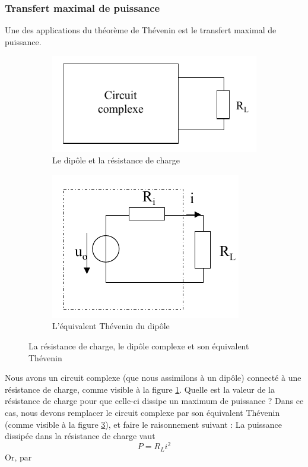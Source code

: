 \documentclass[12pt,a4paper]{article}
\begin{document}
\subsubsection{Transfert maximal de puissance}
Une des applications du théorème de Thévenin est le transfert maximal de puissance. 
\begin{figure}[!h]
	\centering
	\begin{subfigure}[b]{0.45\textwidth}
		\centering
		\includegraphics[scale=0.5]{images/transfert_max_puissance}
		\caption{Le dipôle et la résistance de charge}
		\label{subfig: transfert max puissance}
	\end{subfigure}
	\begin{subfigure}[b]{0.45\textwidth}
		\centering
		\includegraphics[scale=0.5]{images/thevenin_tmp}
		\caption{L'équivalent Thévenin du dipôle}
		\label{subfig: equi thevenin TMP}
	\end{subfigure}
	\caption{La résistance de charge, le dipôle complexe et son équivalent Thévenin}
\end{figure}
Nous avons un circuit complexe (que nous assimilons à un dipôle) connecté à une résistance de charge, comme visible à la figure \ref{subfig: transfert max puissance}. Quelle est la valeur de la résistance de charge pour que celle-ci dissipe un maximum de puissance ? Dans ce cas, nous devons remplacer le circuit complexe par son équivalent Thévenin (comme visible à la figure \ref{subfig: equi thevenin TMP}), et faire le raisonnement suivant : La puissance dissipée dans la résistance de charge vaut 
\[P = R_Li^2\]
Or, par 
\end{document}
